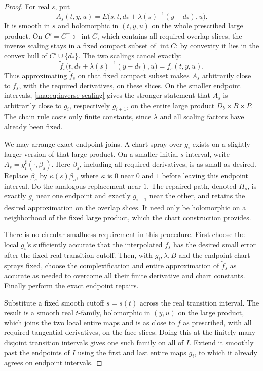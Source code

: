 \begin{proof}
For real \(s\), put
\[
 A_s(t,y,u)=
 E\bigl(s,t,d_*+\lambda(s)^{-1}(y-d_*),u\bigr).
\]
It is smooth in \(s\) and holomorphic in \((t,y,u)\) on the
whole prescribed large product.  On \(C'=C^-\Subset
\operatorname{int}C\), which contains all required overlap slices,
the inverse scaling stays in a fixed compact subset of
\(\operatorname{int}C\): by convexity it lies in the convex hull
of \(C'\cup\{d_*\}\). The two scalings cancel exactly:
\[
 \widetilde f_s\bigl(t,d_*+\lambda(s)^{-1}(y-d_*),u\bigr)
       =f_s(t,y,u).
\]
Thus approximating $\widetilde f_s$ on that fixed compact subset
makes \(A_s\) arbitrarily close to \(f_s\), with the required
derivatives, on these slices.
On the smaller endpoint intervals, \eqref{ana:eq:inverse-scaling}
gives the stronger statement that \(A_s\) is arbitrarily close
to \(g_i\), respectively \(g_{i+1}\), on the entire large
product \(\overline D_b\times B\times P\).
The chain rule costs only finite constants, since \(\lambda\)
and all scaling factors have already been fixed.

We may arrange exact endpoint joins.  A chart spray over
\(g_i\) exists on a slightly larger version of that large
product.  On a smaller initial \(s\)-interval, write
\(A_s=g_i^\sharp(\cdot,\beta_s)\).  Here \(\beta_s\), including
all required derivatives, is as small as desired.
Replace \(\beta_s\) by \(\kappa(s)\beta_s\), where \(\kappa\)
is \(0\) near \(0\) and \(1\) before leaving this endpoint
interval.  Do the analogous replacement near \(1\).
The repaired path, denoted \(H_s\), is exactly \(g_i\) near
one endpoint and exactly \(g_{i+1}\) near the other, and retains
the desired approximation on the overlap slices.  It need
only be holomorphic on a neighborhood of the fixed large
product, which the chart construction provides.

There is no circular smallness requirement in this procedure.
First choose the local \(g_i\)'s sufficiently accurate that
the interpolated \(f_s\) has the desired small error after the
fixed real transition cutoff.  Then, with \(g_i,\lambda,B\)
and the endpoint chart sprays fixed, choose the complexification
and entire approximation of \(\widetilde f_s\) as accurate as
needed to overcome all their finite derivative and chart
constants.  Finally perform the exact endpoint repairs.

Substitute a fixed smooth cutoff \(s=s(t)\) across the real
transition interval.  The result is a smooth real \(t\)-family,
holomorphic in \((y,u)\) on the large product, which joins the
two local entire maps and is as close to \(f\) as prescribed,
with all required tangential derivatives, on the face slices.
Doing this at the finitely many disjoint transition intervals
gives one such family on all of \(I\).  Extend it smoothly
past the endpoints of \(I\) using the first and last entire
maps \(g_i\), to which it already agrees on endpoint intervals.


\end{proof}

